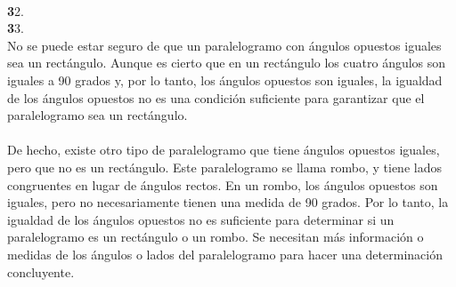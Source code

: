 \documentclass{article}
\begin{document}
\\
{\textbf 32. }\\
{\textbf 33. }\\
No se puede estar seguro de que un paralelogramo con ángulos opuestos iguales sea un rectángulo. Aunque es cierto que en un rectángulo los cuatro ángulos son iguales a 90 grados y, por lo tanto, los ángulos opuestos son iguales, la igualdad de los ángulos opuestos no es una condición suficiente para garantizar que el paralelogramo sea un rectángulo.\\
\\
De hecho, existe otro tipo de paralelogramo que tiene ángulos opuestos iguales, pero que no es un rectángulo. Este paralelogramo se llama rombo, y tiene lados congruentes en lugar de ángulos rectos. En un rombo, los ángulos opuestos son iguales, pero no necesariamente tienen una medida de 90 grados. Por lo tanto, la igualdad de los ángulos opuestos no es suficiente para determinar si un paralelogramo es un rectángulo o un rombo. Se necesitan más información o medidas de los ángulos o lados del paralelogramo para hacer una determinación concluyente.\\
\\
\end{document}
